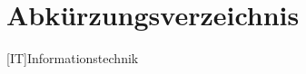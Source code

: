 \section*{Abkürzungsverzeichnis}

\begin{acronym}[ooooooooooo]
  [IT]{Informationstechnik}
\end{acronym}